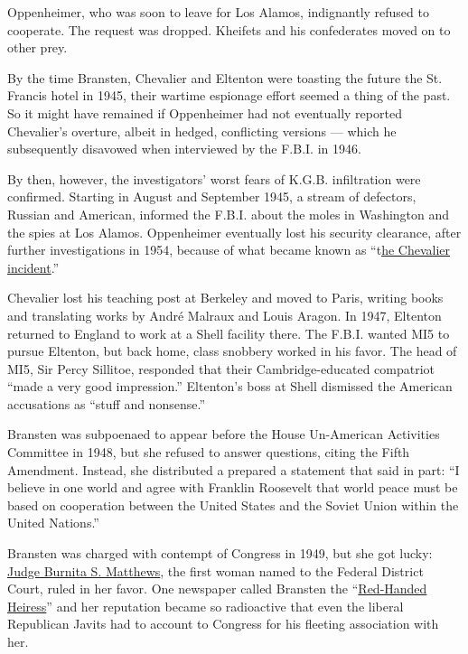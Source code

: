 Oppenheimer, who was soon to leave for Los Alamos, indignantly refused
to cooperate. The request was dropped. Kheifets and his confederates
moved on to other prey.

By the time Bransten, Chevalier and Eltenton were toasting the future
the St. Francis hotel in 1945, their wartime espionage effort seemed a
thing of the past. So it might have remained if Oppenheimer had not
eventually reported Chevalier's overture, albeit in hedged, conflicting
versions --- which he subsequently disavowed when interviewed by the
F.B.I. in 1946.

By then, however, the investigators' worst fears of K.G.B. infiltration
were confirmed. Starting in August and September 1945, a stream of
defectors, Russian and American, informed the F.B.I. about the moles in
Washington and the spies at Los Alamos. Oppenheimer eventually lost his
security clearance, after further investigations in 1954, because of
what became known as
``t\href{http://www.plosin.com/beatbegins/archive/Chevalier.htm}{he
Chevalier incident}.''

Chevalier lost his teaching post at Berkeley and moved to Paris, writing
books and translating works by André Malraux and Louis Aragon. In 1947,
Eltenton returned to England to work at a Shell facility there. The
F.B.I. wanted MI5 to pursue Eltenton, but back home, class snobbery
worked in his favor. The head of MI5, Sir Percy Sillitoe, responded that
their Cambridge-educated compatriot ``made a very good impression.''
Eltenton's boss at Shell dismissed the American accusations as ``stuff
and nonsense.''

Bransten was subpoenaed to appear before the House Un-American
Activities Committee in 1948, but she refused to answer questions,
citing the Fifth Amendment. Instead, she distributed a prepared a
statement that said in part: ``I believe in one world and agree with
Franklin Roosevelt that world peace must be based on cooperation between
the United States and the Soviet Union within the United Nations.''

Bransten was charged with contempt of Congress in 1949, but she got
lucky:
\href{http://www.nytimes.com/1988/04/28/obituaries/burnita-s-matthews-dies-at-93-first-woman-on-us-trial-courts.html?mcubz=0}{Judge
Burnita S. Matthews}, the first woman named to the Federal District
Court, ruled in her favor. One newspaper called Bransten the
``\href{https://www.newspapers.com/newspage/174460864/}{Red-Handed
Heiress}'' and her reputation became so radioactive that even the
liberal Republican Javits had to account to Congress for his fleeting
association with her.

